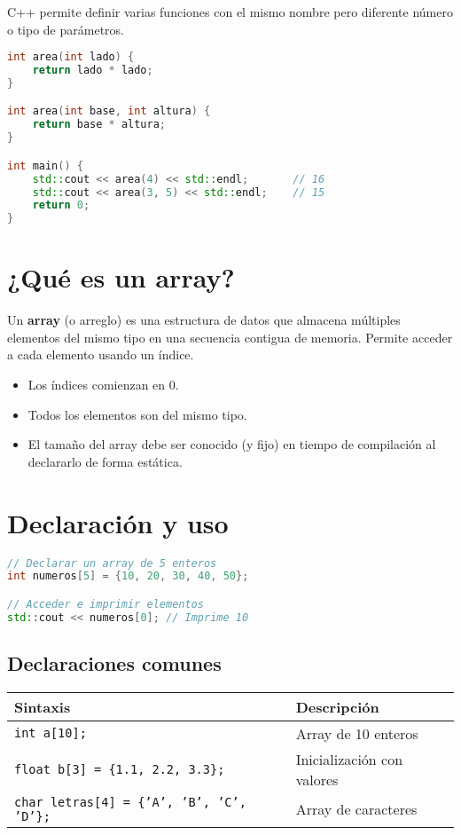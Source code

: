 \documentclass[a4paper]{article}
\begin{document}
C++ permite definir varias funciones con el mismo nombre pero diferente número o tipo de parámetros.

\begin{lstlisting}[language=C++]
int area(int lado) {
    return lado * lado;
}

int area(int base, int altura) {
    return base * altura;
}

int main() {
    std::cout << area(4) << std::endl;       // 16
    std::cout << area(3, 5) << std::endl;    // 15
    return 0;
}
\end{lstlisting}
\newpage
\section{¿Qué es un array?}

Un \textbf{array} (o arreglo) es una estructura de datos que almacena múltiples elementos del mismo tipo en una secuencia contigua de memoria. Permite acceder a cada elemento usando un índice.

\begin{itemize}
    \item Los índices comienzan en 0.
    \item Todos los elementos son del mismo tipo.
    \item El tamaño del array debe ser conocido (y fijo) en tiempo de compilación al declararlo de forma estática.
\end{itemize}

\section{Declaración y uso}

\begin{lstlisting}[language=C++]
// Declarar un array de 5 enteros
int numeros[5] = {10, 20, 30, 40, 50};

// Acceder e imprimir elementos
std::cout << numeros[0]; // Imprime 10
\end{lstlisting}

\subsection*{Declaraciones comunes}

\begin{tabular}{|l|l|}
\hline
\textbf{Sintaxis} & \textbf{Descripción} \\
\hline
\texttt{int a[10];} & Array de 10 enteros \\
\texttt{float b[3] = \{1.1, 2.2, 3.3\};} & Inicialización con valores \\
\texttt{char letras[4] = \{'A', 'B', 'C', 'D'\};} & Array de caracteres \\
\hline
\end{tabular}
\end{document}
